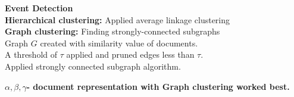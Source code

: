 \documentclass[20pt, a1paper, landscape, margin=0mm, innermargin=15mm,
blockverticalspace=15mm, colspace=15mm, subcolspace=8mm]{tikzposter}
\begin{document}
\begin{columns}
\begin{subcolumns}
{\vspace{1.8cm}

\normalsize{
\begin{minipage}[t]{0.25\textwidth}
\end{minipage}
\begin{minipage}[t]{0.34\textwidth}
  \flushright
  \textbf{\Large{Event Detection}}  \\
   \textbf{Hierarchical clustering:} Applied average linkage clustering \\
   \textbf{Graph clustering:} Finding strongly-connected subgraphs  \\
   \flushleft
   \hspace{5cm}
   Graph $G$ created with similarity value of documents.\\ 
   \hspace{5cm}
   A threshold of $\tau$ applied and pruned edges less than $\tau$.\\
   \hspace{5cm}
   Applied strongly connected subgraph algorithm.\\
   \begin{center}
    \end{center}
\end{minipage}

\hspace{-1.6cm}
   \textbf{ 
   \large{$\alpha, \beta, \gamma$- document representation with Graph clustering worked best.}}
}
}
%
%
%
%
%
%
%
%
%
%
%

%


\end{subcolumns}
\end{columns}
\end{document}
